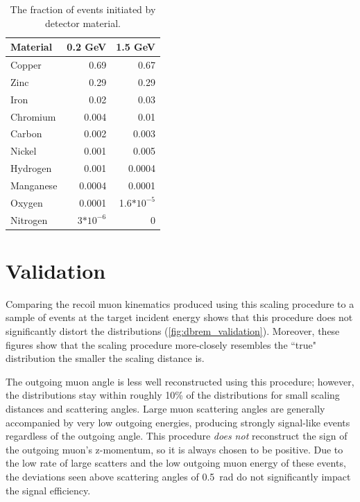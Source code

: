 \begin{table}[h]
    \centering
    \begin{center}
        \begin{tabular}{@{}l rr@{}}
            \toprule
            Material & 0.2 GeV & 1.5 GeV\\
            \midrule
            Copper&0.69&0.67\\
            Zinc&0.29&0.29\\
            Iron&0.02&0.03\\
            Chromium&0.004&0.01\\
            Carbon&0.002&0.003\\
            Nickel&0.001&0.005\\
            Hydrogen&0.001&0.0004\\
            Manganese&0.0004&0.0001\\
            Oxygen&0.0001&1.6$*10^{-5}$\\
            Nitrogen&3$*10^{-6}$&0\\
            \bottomrule
        \end{tabular}
        \caption{
            The fraction of \dbrem events initiated by detector material.
        }
        \label{table:dbrem_material}
    \end{center}
\end{table}
    
\section{Validation}
\label{sec:validation}

Comparing the recoil muon kinematics produced using this scaling procedure to a sample of \mg events at the target incident energy shows that this procedure does not significantly distort the distributions (\cref{fig:dbrem_validation}).
Moreover, these figures show that the scaling procedure more-closely resembles the ``true" \mg distribution the smaller the scaling distance is.

The outgoing muon angle is less well reconstructed using this procedure; however, the distributions stay within roughly 10\% of the \mg distributions for small scaling distances and scattering angles.
Large muon scattering angles are generally accompanied by very low outgoing energies, producing strongly signal-like events regardless of the outgoing angle. 
This procedure \emph{does not} reconstruct the sign of the outgoing muon's z-momentum, so it is always chosen to be positive. 
Due to the low rate of large scatters and the low outgoing muon energy of these events, the deviations seen above scattering angles of \SI{0.5}{\radian} do not significantly impact the signal efficiency.

